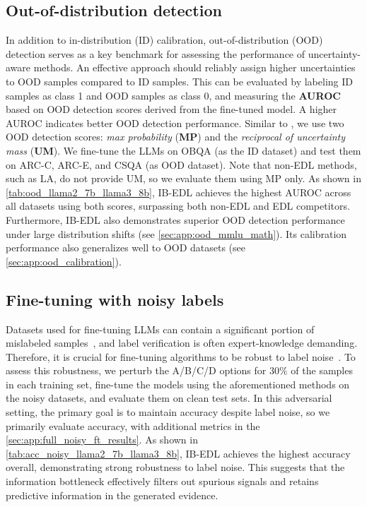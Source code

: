 \subsection{Out-of-distribution detection} \label{sec:exp_ood_detection}

In addition to in-distribution (ID) calibration, out-of-distribution (OOD) detection serves as a key benchmark for assessing the performance of uncertainty-aware methods. An effective approach should reliably assign higher uncertainties to OOD samples compared to ID samples. This can be evaluated by labeling ID samples as class 1 and OOD samples as class 0, and measuring the \textbf{AUROC} based on OOD detection scores derived from the fine-tuned model. A higher AUROC indicates better OOD detection performance. Similar to \citet{chen2024redl}, we use two OOD detection scores: \emph{max probability} (\textbf{MP}) and the \emph{reciprocal of uncertainty mass} (\textbf{UM}). We fine-tune the LLMs on OBQA (as the ID dataset) and test them on ARC-C, ARC-E, and CSQA (as OOD dataset). Note that non-EDL methods, such as LA, do not provide UM, so we evaluate them using MP only. 
As shown in \cref{tab:ood_llama2_7b_llama3_8b}, IB-EDL achieves the highest AUROC across all datasets using both scores, surpassing both non-EDL and EDL competitors. Furthermore, IB-EDL also demonstrates superior OOD detection performance under large distribution shifts (see \cref{sec:app:ood_mmlu_math}). Its calibration performance also generalizes well to OOD datasets (see \cref{sec:app:ood_calibration}).


\subsection{Fine-tuning with noisy labels} \label{sec:exp_ft_noisy_labels}

Datasets used for fine-tuning LLMs can contain a significant portion of mislabeled samples~\citep{wang2024mmlu,havrilla2024understanding}, and label verification is often expert-knowledge demanding. Therefore, it is crucial for fine-tuning algorithms to be robust to label noise~\citep{wang2023noise}. To assess this robustness, we perturb the A/B/C/D options for $30\%$ of the samples in each training set, fine-tune the models using the aforementioned methods on the noisy datasets, and evaluate them on clean test sets. In this adversarial setting, the primary goal is to maintain accuracy despite label noise, so we primarily evaluate accuracy, with additional metrics in the \cref{sec:app:full_noisy_ft_results}. As shown in \cref{tab:acc_noisy_llama2_7b_llama3_8b}, IB-EDL achieves the highest accuracy overall, demonstrating strong robustness to label noise. This suggests that the information bottleneck effectively filters out spurious signals and retains predictive information in the generated evidence.

